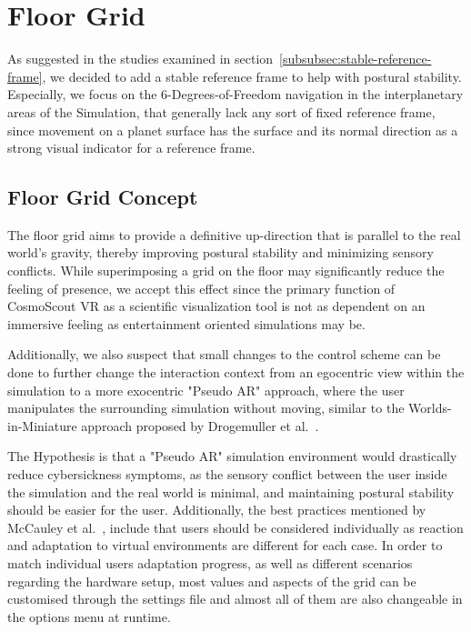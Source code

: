 \section{Floor Grid}\label{sec:floor-grid}

As suggested in the studies examined in section~\ref{subsubsec:stable-reference-frame}, we decided to add a stable
reference frame to help with postural stability.
Especially, we focus on the 6-Degrees-of-Freedom navigation in the interplanetary areas of the Simulation, that
generally lack any sort of fixed reference frame, since movement on a planet surface has the surface and its normal
direction as a strong visual indicator for a reference frame.


\subsection{Floor Grid Concept}\label{subsec:floor-grid-concept}

The floor grid aims to provide a definitive up-direction that is parallel to the real world's gravity, thereby
improving postural stability and minimizing sensory conflicts.
While superimposing a grid on the floor may significantly reduce the feeling of presence, we accept this effect since
the primary function of CosmoScout VR as a scientific visualization tool is not as dependent on an immersive feeling
as entertainment oriented simulations may be.

Additionally, we also suspect that small changes to the control scheme can be done to further change the interaction
context from an egocentric view within the simulation to a more exocentric "Pseudo AR" approach, where the user
manipulates the surrounding simulation without moving, similar to the Worlds-in-Miniature approach proposed
by Drogemuller et al.~\cite{Drogemuller2020}.

The Hypothesis is that a "Pseudo AR" simulation environment would drastically reduce cybersickness symptoms, as the
sensory conflict between the user inside the simulation and the real world is minimal, and maintaining postural
stability should be easier for the user.
Additionally, the best practices mentioned by McCauley et al.~\cite{McCauley1992}, include that users should be
considered individually as reaction and adaptation to virtual environments are different for each case.
In order to match individual users adaptation progress, as well as different scenarios regarding the hardware setup,
most values and aspects of the grid can be customised through the settings file and almost all of them are also
changeable in the options menu at runtime.

